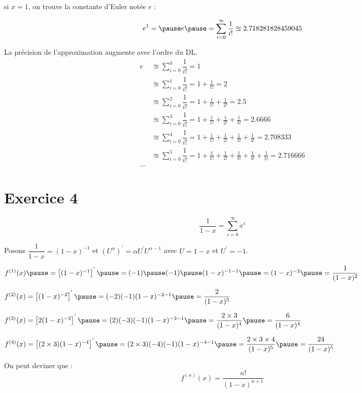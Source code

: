 \documentclass[9pt,handout,professionalfonts,hyperref]{beamer}
\begin{document}
\begin{frame}
si $x=1$, on trouve la constante d'Euler notée $e$ :

$$e^1= \pause e\pause =\sum_{i=0}^{\infty}\dfrac{1}{i!} \approxeq 2.718281828459045$$

La précision de l'approximation augmente avec l'ordre du DL.
\[\begin{aligned}
e
&\approxeq \sum_{i=0}^{0}\dfrac{1}{i!} = 1\\
&\approxeq \sum_{i=0}^{1}\dfrac{1}{i!} = 1 + \frac{1}{1!} = 2\\
&\approxeq \sum_{i=0}^{2}\dfrac{1}{i!} = 1 + \frac{1}{1!} + \frac{1}{2!} = 2.5\\
&\approxeq \sum_{i=0}^{3}\dfrac{1}{i!} = 1 + \frac{1}{1!} + \frac{1}{2!} + \frac{1}{3!} = 2.6666\\
&\approxeq \sum_{i=0}^{4}\dfrac{1}{i!} = 1 + \frac{1}{1!} + \frac{1}{2!} + \frac{1}{3!} + \frac{1}{4!}= 2.708333\\
&\approxeq \sum_{i=0}^{5}\dfrac{1}{i!} = 1 + \frac{1}{1!} + \frac{1}{2!} + \frac{1}{3!} + \frac{1}{4!}+ \frac{1}{5!}= 2.716666\\
\dots
\end{aligned}\]

\end{frame}

\section{Exercice 4}
\begin{frame}
$$
\dfrac{1}{1-x}=\sum_{i=0}^{\infty}x^i
$$
\pause
\medskip

Posons $\dfrac{1}{1-x} = (1-x)^{-1} $ \pause et $(U^\alpha)^{'} = \alpha U^{'} U^{\alpha-1}$ \pause avec $U = 1-x$ \pause et $U^{'} = -1$.

\pause
\medskip
$f^{(1)}(x) \pause = \left[{(1-x)^{-1}}\right]^{'} \pause = (-1)\pause (-1)\pause (1-x)^{-1-1} \pause = (1-x)^{-2} \pause = \dfrac{1}{(1-x)^2}$
\pause
\medskip

$f^{(2)}(x) = \left[ (1-x)^{-2} \right]^{'} \pause =(-2)(-1)(1-x)^{-2-1} \pause =\dfrac{2}{(1-x)^3}$
\pause
\medskip

$f^{(3)}(x) = \left[ 2(1-x)^{-3} \right]^{'} \pause =(2)(-3)(-1)(1-x)^{-3-1} \pause =\dfrac{2\times3}{(1-x)^4}\pause =\dfrac{6}{(1-x)^4}$
\pause
\medskip

$f^{(4)}(x) = \left[ (2\times 3)(1-x)^{-4} \right]^{'} \pause =(2\times3)(-4)(-1)(1-x)^{-4-1} \pause =\dfrac{2\times3\times4}{(1-x)^5}\pause =\dfrac{24}{(1-x)^5}$
\pause

\medskip
On peut deviner que :
$$f^{(n)}(x) =\dfrac{n!}{(1-x)^{n+1}}$$
\end{frame}
\end{document}
